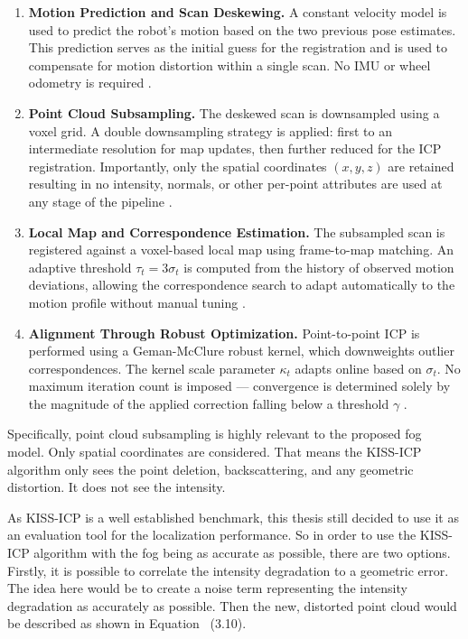 \begin{enumerate}
    \item \textbf{Motion Prediction and Scan Deskewing.} A constant velocity model is used to predict the robot's motion based on the two previous pose estimates. This prediction serves as the initial guess for the registration and is used to compensate for motion distortion within a single scan. No IMU or wheel odometry is required \cite{vizzo_kiss-icp_2023}.
    
    \item \textbf{Point Cloud Subsampling.} The deskewed scan is downsampled using a voxel grid. A double downsampling strategy is applied: first to an intermediate resolution for map updates, then further reduced for the ICP registration. Importantly, only the spatial coordinates $(x, y, z)$ are retained resulting in no intensity, normals, or other per-point attributes are used at any stage of the pipeline \cite{vizzo_kiss-icp_2023}.
    
    \item \textbf{Local Map and Correspondence Estimation.} The subsampled scan is registered against a voxel-based local map using frame-to-map matching. An adaptive threshold $\tau_t = 3\sigma_t$ is computed from the history of observed motion deviations, allowing the correspondence search to adapt automatically to the motion profile without manual tuning \cite{vizzo_kiss-icp_2023}.
    
    \item \textbf{Alignment Through Robust Optimization.} Point-to-point ICP is performed using a Geman-McClure robust kernel, which downweights outlier correspondences. The kernel scale parameter $\kappa_t$ adapts online based on $\sigma_t$. No maximum iteration count is imposed — convergence is determined solely by the magnitude of the applied correction falling below a threshold $\gamma$ \cite{vizzo_kiss-icp_2023}.
\end{enumerate}

Specifically, point cloud subsampling is highly relevant to the proposed fog model. Only spatial coordinates are considered. That means the KISS-ICP algorithm only sees the point deletion, backscattering, and any geometric distortion. It does not see the intensity. 

As KISS-ICP is a well established benchmark, this thesis still decided to use it as an evaluation tool for the localization performance. So in order to use the KISS-ICP algorithm with the fog being as accurate as possible, there are two options. Firstly, it is possible to correlate the intensity degradation to a geometric error. The idea here would be to create a noise term representing the intensity degradation as accurately as possible. Then the new, distorted point cloud would be described as shown in Equation ~(3.10). 

